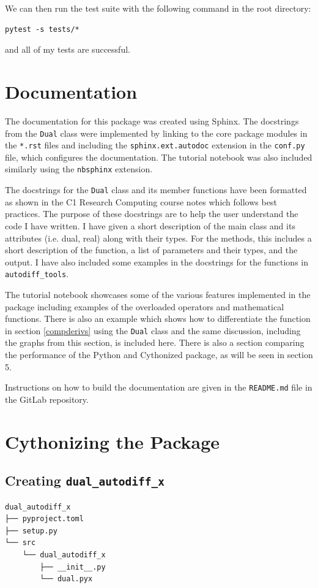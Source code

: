 \documentclass{article}
\begin{document}
We can then run the test suite with the following command in the root directory:
\begin{lstlisting}[style=mypythonstyle]
    pytest -s tests/*
\end{lstlisting}
and all of my tests are successful. 

\section{Documentation} \label{docs}
The documentation for this package was created using Sphinx. The docstrings from the \texttt{Dual} class were implemented by linking to the core package modules in the \texttt{*.rst} files and including the \texttt{sphinx.ext.autodoc} extension in the \texttt{conf.py} file, which configures the documentation. The tutorial notebook was also included similarly using the \texttt{nbsphinx} extension. 

The docstrings for the \texttt{Dual} class and its member functions have been formatted as shown in the C1 Research Computing course notes \cite{research_computing_docs} which follows best practices. The purpose of these docstrings are to help the user understand the code I have written. I have given a short description of the main class and its attributes (i.e. dual, real) along with their types. For the methods, this includes a short description of the function, a list of parameters and their types, and the output. 
I have also included some examples in the docstrings for the functions in \texttt{autodiff\_tools}. 

The tutorial notebook showcases some of the various features implemented in the package including examples of the overloaded operators and mathematical functions. There is also an example which shows how to differentiate the function in section \ref{compderivs} using the \texttt{Dual} class and the same discussion, including the graphs from this section, is included here. There is also a section comparing the performance of the Python and Cythonized package, as will be seen in section 5.

Instructions on how to build the documentation are given in the \texttt{README.md} file in the GitLab repository. 

\section{Cythonizing the Package}

\subsection{Creating \texttt{dual\_autodiff\_x}}
\begin{verbatim}
dual_autodiff_x
├── pyproject.toml
├── setup.py
└── src
    └── dual_autodiff_x
        ├── __init__.py
        └── dual.pyx

\end{verbatim}
\end{document}

